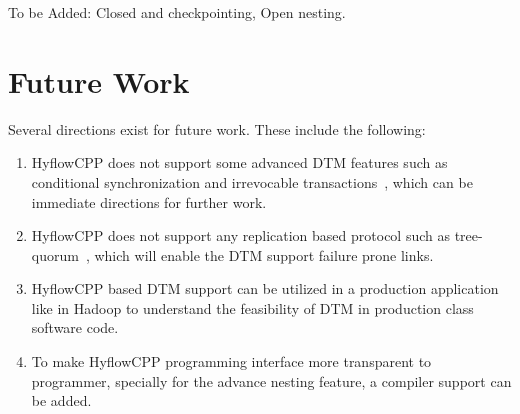 \documentclass[12pt,english]{report}
\begin{document}
To be Added: Closed and checkpointing, Open nesting.


\section{Future Work}

Several directions exist for future work. These include the following:

\begin{enumerate}
\item HyflowCPP does not support some advanced DTM features such as conditional synchronization and 
irrevocable transactions~\cite{welc2008irrevocable}, which can be immediate directions for further work.
\item HyflowCPP does not support any replication based protocol such as tree-quorum~\cite{Zhang:2011:QRF:2183536.2183539}, which will enable the DTM support failure prone links.
\item HyflowCPP based DTM support can be utilized in a production application like in Hadoop to understand the feasibility of DTM in production class software code.
\item To make HyflowCPP programming interface more transparent to programmer, specially for the advance nesting feature, a compiler support can be added. 
\end{enumerate}

\newpage
{}



\end{document}
